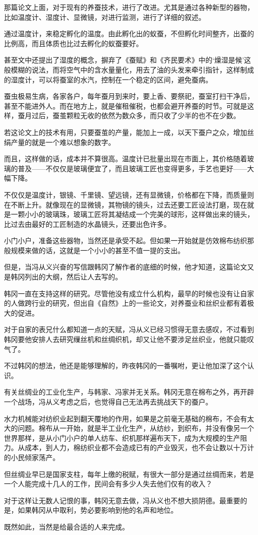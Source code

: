 那篇论文上面，对于现有的养蚕技术，进行了改进。尤其是通过各种新型的器物，比如温度计、湿度计、显微镜，对进行监测，进行了详细的叙述。

通过温度计，来稳定孵化的温度。由此孵化出的蚁蚕，不但孵化时间整齐，出蚕的比例高，而且体质也比过去孵化的蚁蚕要好。

甚至文中还提出了湿度的概念，摒弃了《蚕赋》和《齐民要术》中的‘燥湿是候’这般模糊的说法，而将空气中的含水量量化，用去了油的头发来牵引指针，这样制成的湿度计，可以将蚕室的水汽，控制在一个稳定的区间，避免蚕病。

蚕虫极易生病，各家各户，每年蚕月到来时，要上香、要祭祀，蚕室打扫干净后，甚至不能进外人。而在地方上，就是催租催税，也都会避开养蚕的时节。可就是这样，蚕月过后，蚕茧颗粒无收的依然为数众多，而只收了少半的也不在少数。

若这论文上的技术有用，只要蚕茧的产量，能加上一成，以天下蚕户之众，增加丝绢产量的就是一个难以想象的数字。

而且，这样做的话，成本并不算很高。温度计已批量出现在市面上，其价格随着玻璃的普及——不仅仅是玻璃便宜了，而且玻璃工匠也变得更多，手艺也更好——大幅下降。

不仅仅是温度计，银镜、千里镜、望远镜，还有显微镜，价格都在下降，而质量则在不断上升。就像现在的显微镜，其物镜的镜头，过去还要工匠设法打磨，现在就是一颗小小的玻璃珠，玻璃工匠将其凝结成一个完美的球形，这样做出来的镜头，比过去由最好的工匠制造的水晶镜头，还要出色许多。

小门小户，准备这些器物，当然还是承受不起。但如果一开始就是仿效棉布纺织那般规模来做的话，这就是一个小小的甚至不值一提的支出。

但是，当冯从义兴奋的写信跟韩冈了解作者的底细的时候，他才知道，这篇论文又是韩冈列出的大纲，然后让人去写的。

韩冈一直在支持这样的研究。尽管他没有成立什么机构，最早的时候也没有让自家的人做跨行业的研究，但出自《自然》上的一些论文，对养蚕业和丝织业都有着极大的促进。

对于自家的表兄什么都知道一点的天赋，冯从义已经习惯得无意去感叹，不过看到韩冈要他安排人去研究缫丝机和丝绸织机，却又让他不要涉足丝织业，他就只能叹气了。

不过韩冈的想法，他还是能够理解的，昨夜韩冈的一番嘱咐，更让他加深了这个认识。

有关丝绸业的工业化生产，与韩家、冯家并无关系。韩冈无意在棉布之外，再开辟一个战场，冯从义考虑之后，也觉得自己无法再去挑战天下的蚕户。

水力机械能对纺织业起到翻天覆地的作用，如果是之前毫无基础的棉布，不会有太大的问题。棉布从一开始，就是半工业化生产，从纺纱，到织布，并没有像另一个世界那样，是从小门小户的单人纺车、织机那样遍布天下，成为大规模的生产阻力。从成本，到人力，棉纺织业都不会造成已有的产业毁灭，也不会让数以十万计的小民倾家荡产。

但丝绸业早已是国家支柱，每年上缴的税赋，有很大一部分是通过丝绸而来，若是一个人能完成十几人的工作，民间会有多少人失去他们仅有的收入？

对于这样让无数人记恨的事，韩冈无意去做，冯从义也不想大损阴德。最重要的是，如果韩冈从中取利，势必要影响到他的名声和地位。

既然如此，当然是给最合适的人来完成。
